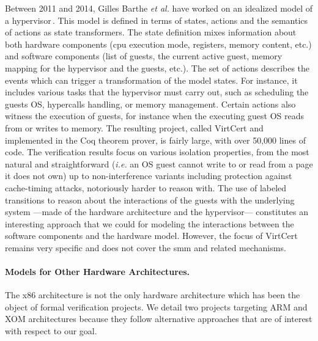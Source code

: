 Between 2011 and 2014, Gilles Barthe \emph{et al.} have worked on an idealized
model of a
hypervisor\,\cite{barthe2011virtcert1,barthe2012virtcert2,barthe2014virtcert3}.
%
This model is defined in terms of states, actions and the semantics of actions
as state trans\-formers.
%
The state definition mixes information about both hardware components (\ac{cpu}
execution mode, registers, memory content, etc.) and software components (list
of guests, the current active guest, memory mapping for the hypervisor and the
guests, etc.).
%
The set of actions describes the events which can trigger a transformation of
the model states.
%
For instance, it includes various tasks that the hypervisor must carry out, such
as scheduling the guests OS, hypercalls handling, or memory management.
%
Certain actions also witness the execution of guests, for instance when the
executing guest OS reads from or writes to memory.
%
The resulting project, called VirtCert and implemented in the Coq theorem
prover, is fairly large, with over 50,000 lines of code.
%
The verification results focus on various isolation properties, from the most
natural and straightforward (\emph{i.e.} an OS guest cannot write to or read
from a page it does not own) up to non-interference variants including
protection against cache-timing attacks, notoriously harder to reason with.
%
The use of labeled transitions to reason about the interactions of the guests
with the underlying system ---made of the hardware architecture and the
hypervisor--- constitutes an interesting approach that we could for modeling the
interactions between the software components and the hardware model.
%
However, the focus of VirtCert remains very specific and does not cover the
\ac{smm} and related mechanisms.

\paragraph{Models for Other Hardware Architectures.}
%
The x86 architecture is not the only hardware architecture which has been the
object of formal verification projects.
%
We detail two projects targeting ARM and XOM architectures because they follow
alternative approaches that are of interest with respect to our goal.

